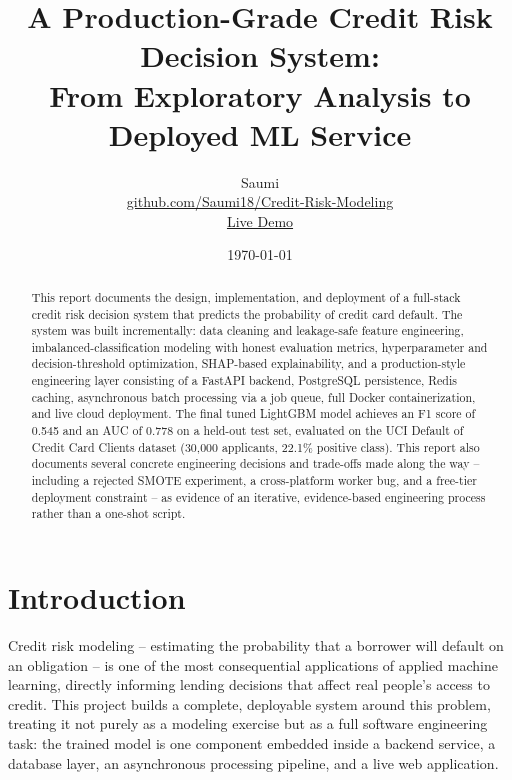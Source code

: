 \documentclass[11pt]{article}
\title{\textbf{A Production-Grade Credit Risk Decision System:\\
From Exploratory Analysis to Deployed ML Service}}
\author{Saumi \\ \small \href{https://github.com/Saumi18/Credit-Risk-Modeling}{github.com/Saumi18/Credit-Risk-Modeling} \\ \small \href{https://credit-risk-modeling.vercel.app}{Live Demo}}
\date{\today}
\begin{document}
\maketitle

\begin{abstract}
This report documents the design, implementation, and deployment of a full-stack
credit risk decision system that predicts the probability of credit card default.
The system was built incrementally: data cleaning and leakage-safe feature
engineering, imbalanced-classification modeling with honest evaluation metrics,
hyperparameter and decision-threshold optimization, SHAP-based explainability,
and a production-style engineering layer consisting of a FastAPI backend,
PostgreSQL persistence, Redis caching, asynchronous batch processing via a
job queue, full Docker containerization, and live cloud deployment. The final
tuned LightGBM model achieves an F1 score of 0.545 and an AUC of 0.778 on a
held-out test set, evaluated on the UCI Default of Credit Card Clients dataset
(30{,}000 applicants, 22.1\% positive class). This report also documents
several concrete engineering decisions and trade-offs made along the way --
including a rejected SMOTE experiment, a cross-platform worker bug, and a
free-tier deployment constraint -- as evidence of an iterative, evidence-based
engineering process rather than a one-shot script.
\end{abstract}

\tableofcontents
\newpage

\section{Introduction}

Credit risk modeling -- estimating the probability that a borrower will
default on an obligation -- is one of the most consequential applications
of applied machine learning, directly informing lending decisions that
affect real people's access to credit. This project builds a complete,
deployable system around this problem, treating it not purely as a modeling
exercise but as a full software engineering task: the trained model is one
component embedded inside a backend service, a database layer, an
asynchronous processing pipeline, and a live web application.
\end{document}
